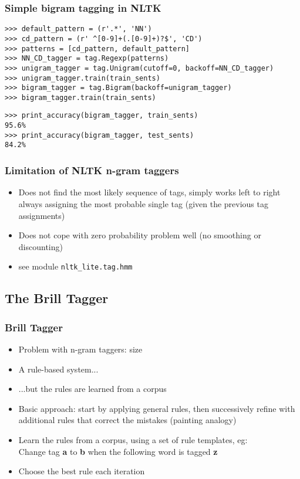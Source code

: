 \documentclass{beamer}             %
\begin{document}
\begin{frame}[fragile]
  \frametitle{Simple bigram tagging in NLTK}
{\small
\begin{verbatim}
>>> default_pattern = (r'.*', 'NN')
>>> cd_pattern = (r' ^[0-9]+(.[0-9]+)?$', 'CD')
>>> patterns = [cd_pattern, default_pattern]
>>> NN_CD_tagger = tag.Regexp(patterns)
>>> unigram_tagger = tag.Unigram(cutoff=0, backoff=NN_CD_tagger)
>>> unigram_tagger.train(train_sents)
>>> bigram_tagger = tag.Bigram(backoff=unigram_tagger)
>>> bigram_tagger.train(train_sents)
\end{verbatim}%

\begin{verbatim}
>>> print_accuracy(bigram_tagger, train_sents)
95.6%
>>> print_accuracy(bigram_tagger, test_sents)
84.2%
\end{verbatim}
}
\end{frame}

\begin{frame}[fragile]
  \frametitle{Limitation of NLTK n-gram taggers}

  \begin{itemize}
  \item Does not find the most likely sequence of tags, simply works
    left to right always assigning the most probable single tag (given
    the previous tag assignments)
  \item Does not cope with zero probability problem well (no smoothing
    or discounting)
  \item see module \verb|nltk_lite.tag.hmm|
  \end{itemize}
\end{frame}

\subsection{The Brill Tagger}

\begin{frame}
  \frametitle{Brill Tagger}
  \begin{itemize}
  \item Problem with n-gram taggers: size
  \item A rule-based system...
  \item ...but the rules are learned from a corpus
  \item Basic approach: start by applying general rules, then
    successively refine with additional rules that correct the
    mistakes (painting analogy)
  \item Learn the rules from a corpus, using a set of rule templates,
    eg:\\
    Change tag \textbf{a} to \textbf{b} when the following word is
    tagged \textbf{z}
  \item Choose the best rule each iteration    
  \end{itemize}
\end{frame}
\end{document}
